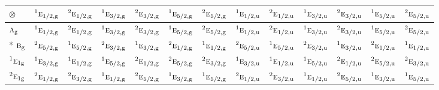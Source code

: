 \documentclass[10pt,a4paper]{article}
\numberwithin{equation}{section}
\newcommand{\irr}[1]{\text{\normalfont\scshape #1}}
\newcommand{\conjpair}[1]{{}^{#1}}
\newcommand{\ptag}[1]{\mathrm{#1}}
\newcommand{\irrprod}{\otimes}
\begin{document}
{\small\setlength{\tabcolsep}{3pt}\begin{longtable}{@{}lcccccccccccc@{}}\toprule
$\irrprod$ & $\conjpair{1}\irr{e}_{1/2,\ptag{g}}$ & $\conjpair{2}\irr{e}_{1/2,\ptag{g}}$ & $\conjpair{1}\irr{e}_{3/2,\ptag{g}}$ & $\conjpair{2}\irr{e}_{3/2,\ptag{g}}$ & $\conjpair{1}\irr{e}_{5/2,\ptag{g}}$ & $\conjpair{2}\irr{e}_{5/2,\ptag{g}}$ & $\conjpair{1}\irr{e}_{1/2,\ptag{u}}$ & $\conjpair{2}\irr{e}_{1/2,\ptag{u}}$ & $\conjpair{1}\irr{e}_{3/2,\ptag{u}}$ & $\conjpair{2}\irr{e}_{3/2,\ptag{u}}$ & $\conjpair{1}\irr{e}_{5/2,\ptag{u}}$ & $\conjpair{2}\irr{e}_{5/2,\ptag{u}}$\\\midrule\endhead
\bottomrule\endfoot\endlastfoot
$\irr{a}_{\ptag{g}}$ & $\conjpair{1}\irr{e}_{1/2,\ptag{g}}$ & $\conjpair{2}\irr{e}_{1/2,\ptag{g}}$ & $\conjpair{1}\irr{e}_{3/2,\ptag{g}}$ & $\conjpair{2}\irr{e}_{3/2,\ptag{g}}$ & $\conjpair{1}\irr{e}_{5/2,\ptag{g}}$ & $\conjpair{2}\irr{e}_{5/2,\ptag{g}}$ & $\conjpair{1}\irr{e}_{1/2,\ptag{u}}$ & $\conjpair{2}\irr{e}_{1/2,\ptag{u}}$ & $\conjpair{1}\irr{e}_{3/2,\ptag{u}}$ & $\conjpair{2}\irr{e}_{3/2,\ptag{u}}$ & $\conjpair{1}\irr{e}_{5/2,\ptag{u}}$ & $\conjpair{2}\irr{e}_{5/2,\ptag{u}}$\\*
$\irr{b}_{\ptag{g}}$ & $\conjpair{2}\irr{e}_{5/2,\ptag{g}}$ & $\conjpair{1}\irr{e}_{5/2,\ptag{g}}$ & $\conjpair{2}\irr{e}_{3/2,\ptag{g}}$ & $\conjpair{1}\irr{e}_{3/2,\ptag{g}}$ & $\conjpair{2}\irr{e}_{1/2,\ptag{g}}$ & $\conjpair{1}\irr{e}_{1/2,\ptag{g}}$ & $\conjpair{2}\irr{e}_{5/2,\ptag{u}}$ & $\conjpair{1}\irr{e}_{5/2,\ptag{u}}$ & $\conjpair{2}\irr{e}_{3/2,\ptag{u}}$ & $\conjpair{1}\irr{e}_{3/2,\ptag{u}}$ & $\conjpair{2}\irr{e}_{1/2,\ptag{u}}$ & $\conjpair{1}\irr{e}_{1/2,\ptag{u}}$\\
$\conjpair{1}\irr{e}_{1\ptag{g}}$ & $\conjpair{1}\irr{e}_{3/2,\ptag{g}}$ & $\conjpair{1}\irr{e}_{1/2,\ptag{g}}$ & $\conjpair{1}\irr{e}_{5/2,\ptag{g}}$ & $\conjpair{2}\irr{e}_{1/2,\ptag{g}}$ & $\conjpair{2}\irr{e}_{5/2,\ptag{g}}$ & $\conjpair{2}\irr{e}_{3/2,\ptag{g}}$ & $\conjpair{1}\irr{e}_{3/2,\ptag{u}}$ & $\conjpair{1}\irr{e}_{1/2,\ptag{u}}$ & $\conjpair{1}\irr{e}_{5/2,\ptag{u}}$ & $\conjpair{2}\irr{e}_{1/2,\ptag{u}}$ & $\conjpair{2}\irr{e}_{5/2,\ptag{u}}$ & $\conjpair{2}\irr{e}_{3/2,\ptag{u}}$\\
$\conjpair{2}\irr{e}_{1\ptag{g}}$ & $\conjpair{2}\irr{e}_{1/2,\ptag{g}}$ & $\conjpair{2}\irr{e}_{3/2,\ptag{g}}$ & $\conjpair{1}\irr{e}_{1/2,\ptag{g}}$ & $\conjpair{2}\irr{e}_{5/2,\ptag{g}}$ & $\conjpair{1}\irr{e}_{3/2,\ptag{g}}$ & $\conjpair{1}\irr{e}_{5/2,\ptag{g}}$ & $\conjpair{2}\irr{e}_{1/2,\ptag{u}}$ & $\conjpair{2}\irr{e}_{3/2,\ptag{u}}$ & $\conjpair{1}\irr{e}_{1/2,\ptag{u}}$ & $\conjpair{2}\irr{e}_{5/2,\ptag{u}}$ & $\conjpair{1}\irr{e}_{3/2,\ptag{u}}$ & $\conjpair{1}\irr{e}_{5/2,\ptag{u}}$\\

\end{longtable}}
\end{document}
